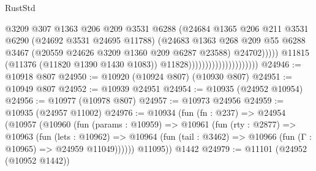 \begin{lexlean}{RustStd}
\begin{coremodule}
{{{{{{{{{{{{{{{{{{{                                                    @3209
                                                    @307
                                                    @1363
                                                    @206
                                                    @209
                                                    @3531
                                                    @6288
                                                    (@24684
                                                      @1365
                                                      @206
                                                      @211
                                                      @3531
                                                      @6290
                                                      (@24692 @3531 @24695 @11788)
                                                      (@24683
                                                        @1363
                                                        @268
                                                        @209
                                                        @55
                                                        @6288
                                                        @3467
                                                        (@20559
                                                          @24626
                                                          @3209
                                                          @1360
                                                          @209
                                                          @6287
                                                          @23588)
                                                        @24702)))))
                                              @11815
                                              (@11376 (@11820 @1390 @1430 @1083))
                                              @11828)))))))))))))))))))))
@24946 := @10918 @807
@24950 := @10920 (@10924 @807) (@10930 @807)
@24951 := @10949 @807
@24952 := @10939 @24951
@24954 := @10935 (@24952 @10954)
@24956 := @10977 (@10978 @807)
@24957 := @10973 @24956
@24959 := @10935 (@24957 @11002)
@24976 := @10934
    (fun (fn : @237) =>
    @24954
      (@10957
        (@10960
          (fun (params : @10959) =>
          @10961
            (fun (rty : @2877) =>
            @10963
              (fun (lets : @10962) =>
              @10964 (fun (tail : @3462) => @10966 (fun (Γ : @10965) => @24959 @11049))))))
        @11095))
    @1442
@24979 := @11101 (@24952 (@10952 @1442))
}}}}}}}}}}}}}}}}}}}
\end{coremodule}
\end{lexlean}
